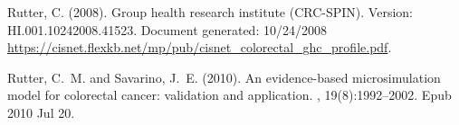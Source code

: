 \documentclass[11pt]{article}
\begin{document}
\clearpage
\begin{thebibliography}{}

%
%
  
Rutter, C. (2008).
\newblock Group health research institute ({CRC-SPIN}).
\newblock Version: HI.001.10242008.41523. Document generated: 10/24/2008
  \url{https://cisnet.flexkb.net/mp/pub/cisnet_colorectal_ghc_profile.pdf}.

Rutter, C.~M. and Savarino, J.~E. (2010).
\newblock An evidence-based microsimulation model for colorectal cancer:
  validation and application.
, 19(8):1992--2002.
\newblock Epub 2010 Jul 20.
\end{thebibliography}
\end{document}
